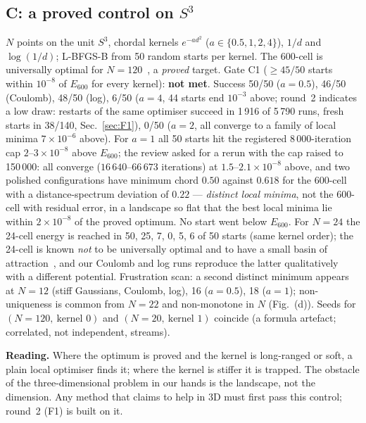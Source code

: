 \documentclass[11pt,a4paper]{article}
\begin{document}
\subsection{C: a proved control on $S^3$}\label{sec:C}
$N$ points on the unit $S^3$, chordal kernels $e^{-a d^2}$ ($a\in\{0.5,1,2,4\}$), $1/d$ and $\log(1/d)$; L-BFGS-B from 50 random
starts per kernel. The 600-cell is universally optimal for $N=120$~\cite{CK07}, a \emph{proved} target. Gate C1 ($\ge45/50$ starts
within $10^{-8}$ of $E_{600}$ for every kernel): \textbf{not met}. Success 50/50 ($a=0.5$), 46/50 (Coulomb), 48/50 (log), 6/50
($a=4$, 44 starts end $10^{-3}$ above; round~2 indicates a low draw: restarts of the same optimiser succeed in 1\,916 of 5\,790 runs, fresh starts in 38/140, Sec.~\ref{sec:F1}), 0/50 ($a=2$, all converge to a family of local minima $7\times10^{-6}$ above). For $a=1$ all
50 starts hit the registered 8\,000-iteration cap $2$--$3\times10^{-8}$ above $E_{600}$; the review asked for a rerun with the cap
raised to 150\,000: all converge ($16\,640$--$66\,673$ iterations) at $1.5$--$2.1\times10^{-8}$ above, and two polished configurations
have minimum chord $0.50$ against $0.618$ for the 600-cell with a distance-spectrum deviation of $0.22$ --- \emph{distinct local
minima}, not the 600-cell with residual error, in a landscape so flat that the best local minima lie within $2\times10^{-8}$ of
the proved optimum. No start went below $E_{600}$. For $N=24$ the 24-cell energy is reached in 50, 25, 7, 0, 5, 6 of 50 starts
(same kernel order); the 24-cell is known \emph{not} to be universally optimal and to have a small basin of attraction~\cite{CCEK07},
and our Coulomb and log runs reproduce the latter qualitatively with a different potential. Frustration scan: a second
distinct minimum appears at $N=12$ (stiff Gaussians, Coulomb, log), 16 ($a=0.5$), 18 ($a=1$); non-uniqueness is common from
$N=22$ and non-monotone in $N$ (Fig.~(d)). Seeds for $(N=120,\ \text{kernel }0)$ and $(N=20,\ \text{kernel }1)$ coincide (a formula
artefact; correlated, not independent, streams).

\begin{failbox}
\textbf{Reading.} Where the optimum is proved and the kernel is long-ranged or soft, a plain local optimiser finds it; where the
kernel is stiffer it is trapped. The obstacle of the three-dimensional problem in our hands is the landscape, not the dimension.
Any method that claims to help in 3D must first pass this control; round~2 (F1) is built on it.
\end{failbox}
\end{document}
